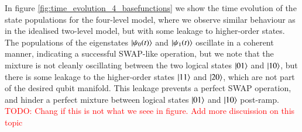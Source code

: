 \documentclass{subfiles}
\begin{document}
In figure \ref{fig:time_evolution_4_basefunctions} we show the time evolution of the state populations for the four-level model, where we observe similar behaviour as in the idealised two-level model, but with some leakage to higher-order states. The populations of the eigenstates $\ket{\psi_0(t)}$ and $\ket{\psi_1(t)}$ oscillate in a coherent manner, indicating a successful SWAP-like operation, but we note that the mixture is not cleanly oscillating between the two logical states $\ket{01}$ and $\ket{10}$, but there is some leakage to the higher-order states $\ket{11}$ and $\ket{20}$, which are not part of the desired qubit manifold. This leakage prevents a perfect SWAP operation, and hinder a perfect mixture between logical states $\ket{01}$ and $\ket{10}$ post-ramp. \textcolor{red}{TODO: Chang if this is not what we seee in figure. Add more discuission on this topic}
\end{document}
